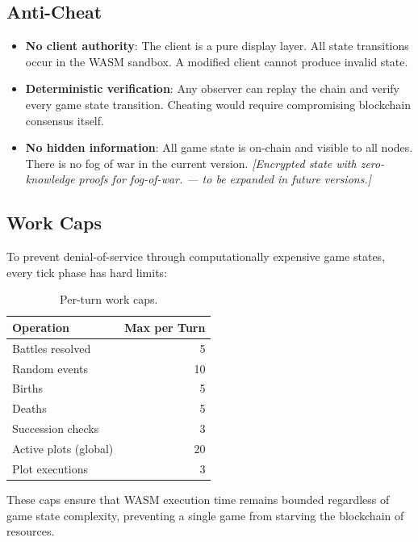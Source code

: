\documentclass[a4paper, 11pt]{article}
\newcommand{\placeholder}[1]{\textit{[#1 --- to be expanded in future versions.]}}
\begin{document}
\subsection{Anti-Cheat}

\begin{itemize}
  \item \textbf{No client authority}: The client is a pure display layer.
    All state transitions occur in the WASM sandbox. A modified client
    cannot produce invalid state.
  \item \textbf{Deterministic verification}: Any observer can replay the
    chain and verify every game state transition. Cheating would require
    compromising blockchain consensus itself.
  \item \textbf{No hidden information}: All game state is on-chain and
    visible to all nodes. There is no fog of war in the current version.
    \placeholder{Encrypted state with zero-knowledge proofs for fog-of-war.}
\end{itemize}

\subsection{Work Caps}

To prevent denial-of-service through computationally expensive game states,
every tick phase has hard limits:

\begin{table}[htbp]
\centering
\caption{Per-turn work caps.}
\label{tab:workcaps}
\begin{tabular}{@{}lr@{}}
\toprule
\textbf{Operation} & \textbf{Max per Turn} \\
\midrule
Battles resolved     & 5 \\
Random events        & 10 \\
Births               & 5 \\
Deaths               & 5 \\
Succession checks    & 3 \\
Active plots (global) & 20 \\
Plot executions      & 3 \\
\bottomrule
\end{tabular}
\end{table}

These caps ensure that WASM execution time remains bounded regardless of game
state complexity, preventing a single game from starving the blockchain of
resources.


\end{document}
